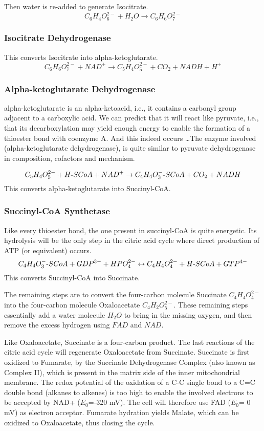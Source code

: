 \documentclass{article}
\def\mhyphen{{\hbox{-}}}
\begin{document}
Then water is re-added to generate Isocitrate.
\[
    C_6H_4O_6^{2-} + H_2O \rightarrow C_6H_6O_7^{2-}
\]

\subsubsection{Isocitrate Dehydrogenase}
This converts Isocitrate into alpha-ketoglutarate.
\[
    C_6H_6O_7^{2-} + NAD^+ \rightarrow C_5H_4O_5^{2-} + CO_2 + NADH + H^+
\]

\subsubsection{Alpha-ketoglutarate Dehydrogenase}
alpha-ketoglutarate is an alpha-ketoacid, i.e., it contains a carbonyl group adjacent to a
carboxylic acid. We can predict that it will react like pyruvate, i.e., that its
decarboxylation may yield enough energy to enable the formation of a thioester bond with
coenzyme A. And this indeed occurs \ldots The enzyme involved (alpha-ketoglutarate dehydrogenase),
is quite similar to pyruvate dehydrogenase in composition, cofactors and mechanism.

\[
    C_5H_4O_5^{2-} + H{\mhyphen}SCoA + NAD^+ \rightarrow
    C_4H_4O_3^{-}{\mhyphen}SCoA + CO_2 + NADH
\]
This converts alpha-ketoglutarate into Succinyl-CoA.

\subsubsection{Succinyl-CoA Synthetase}
Like every thioester bond, the one present in succinyl-CoA is quite energetic. Its
hydrolysis will be the only step in the citric acid cycle where direct production of ATP
(or equivalent) occurs.
\[
    C_4H_4O_3^{-}{\mhyphen}SCoA + GDP^{3-} + HPO_4^{2-} \leftrightarrow
    C_4H_4O_4^{2-} + H{\mhyphen}SCoA + GTP^{4-}
\]
This converts Succinyl-CoA into Succinate.

The remaining steps are to convert the four-carbon molecule Succinate $C_4H_4O_4^{2-}$
into the four-carbon molecule Oxaloacetate $C_4H_2O_5^{2-}$. These remaining steps
essentially add a water molecule $H_2O$ to bring in the missing oxygen, and then remove
the excess hydrogen using $FAD$ and $NAD$.

Like Oxaloacetate, Succinate is a four-carbon product. The last reactions of the citric
acid cycle will regenerate Oxaloacetate from Succinate. Succinate is first oxidized to
Fumarate, by the Succinate Dehydrogenase Complex (also known as Complex II), which is
present in the matrix side of the inner mitochondrial membrane. The redox potential of the
oxidation of a C-C single bond to a C=C double bond (alkanes to alkenes) is too high to
enable the involved electrons to be accepted by NAD+ ($E_0$=-320 mV). The cell will therefore
use FAD ($E_0$= 0 mV) as electron acceptor. Fumarate hydration yields Malate, which can be
oxidized to Oxaloacetate, thus closing the cycle.
\end{document}
